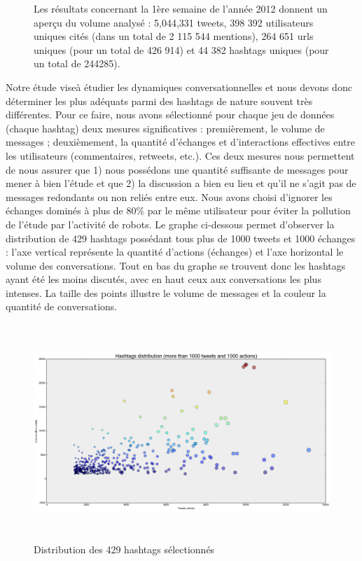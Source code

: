 \begin{figure}
    \caption[Volume de tweets et hashtags pour la semaine 1]{Les r\'esultats concernant la 1\`ere semaine de l{\textquoteright}ann\'ee 2012 donnent un aper\c{c}u du volume analys\'e : 5,044,331 tweets, 398 392 utilisateurs uniques cit\'es (dans un total de 2 115 544 mentions), 264 651 urls uniques (pour un total de 426 914) et 44 382 hashtags uniques (pour un total de 244285).}
\end{figure}



Notre \'etude vise\`a \'etudier les dynamiques conversationnelles et
nous devons donc d\'eterminer les plus ad\'equats parmi des hashtags de
nature souvent tr\`es diff\'erentes. Pour ce faire, nous avons
s\'electionn\'e pour chaque jeu de donn\'ees (chaque hashtag) deux
mesures significatives : premi\`erement, le volume de messages ;
deuxi\`emement, la quantit\'e d{\textquoteright}\'echanges et
d{\textquoteright}interactions effectives entre les utilisateurs
(commentaires, retweets, etc.). Ces deux mesures nous permettent de
nous assurer que 1) nous poss\'edons une quantit\'e suffisante de
messages pour mener \`a bien l{\textquoteright}\'etude et que 2) la
discussion a bien eu lieu et qu{\textquoteright}il ne
s{\textquoteright}agit pas de messages redondants ou non reli\'es entre
eux. Nous avons choisi d{\textquoteright}ignorer les \'echanges
domin\'es \`a plus de 80\% par le m\^eme utilisateur pour \'eviter la
pollution de l{\textquoteright}\'etude par l{\textquoteright}activit\'e
de robots. Le graphe ci-dessous permet d{\textquoteright}observer la
distribution de 429 hashtags poss\'edant tous plus de 1000 tweets et
1000 \'echanges : l{\textquoteright}axe vertical repr\'esente la
quantit\'e d{\textquoteright}actions (\'echanges) et
l{\textquoteright}axe horizontal le volume des conversations. Tout en
bas du graphe se trouvent donc les hashtags ayant \'et\'e les moins
discut\'es, avec en haut ceux aux conversations les plus intenses. La
taille des points illustre le volume de messages et la couleur la
quantit\'e de %
conversations.

\begin{figure}
    \centering
    \includegraphics[width=6.0114in,height=3.2114in]{figures/chap3/chapitre3-img8.png}
    \caption{Distribution des 429 hashtags s\'electionn\'es }
\end{figure}


